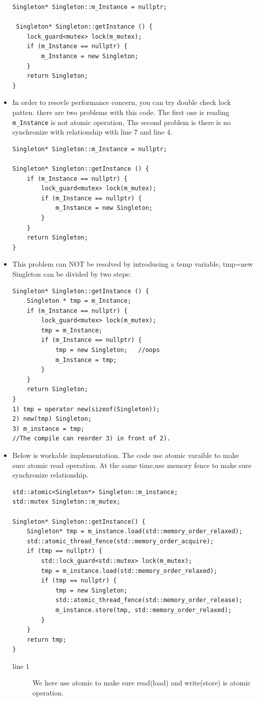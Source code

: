 \documentclass[a4paper,11pt,twoside]{book}
\begin{document}
\begin{itemize}
\begin{lstlisting}[]
Singleton* Singleton::m_Instance = nullptr;

 Singleton* Singleton::getInstance () {
	lock_guard<mutex> lock(m_mutex);
	if (m_Instance == nullptr) {
		m_Instance = new Singleton;
	}
	return Singleton;
}   
\end{lstlisting}

    \item In order to resovle performance concern, you can try double check lock patten. there are two problems with this code. The first one is reading \texttt{m\_Instance} is not atomic operation,  The second problem is there is no synchronize with relationship with line 7 and line 4. 
\begin{lstlisting}[]
Singleton* Singleton::m_Instance = nullptr;

Singleton* Singleton::getInstance () {
	if (m_Instance == nullptr) {
		lock_guard<mutex> lock(m_mutex);
		if (m_Instance == nullptr) {
			m_Instance = new Singleton;
		}
	}
	return Singleton;
}
\end{lstlisting}

    \item This problem can NOT be resolved by introducing a temp variable, tmp=new Singleton can be divided by two steps: 
\begin{lstlisting}[]
Singleton* Singleton::getInstance () {
	Singleton * tmp = m_Instance;
	if (m_Instance == nullptr) {
		lock_guard<mutex> lock(m_mutex);
		tmp = m_Instance;
		if (m_Instance == nullptr) {
			tmp = new Singleton;   //oops
			m_Instance = tmp;  
		}
	}
	return Singleton;
}
1) tmp = operator new(sizeof(Singleton));  
2) new(tmp) Singleton;  
3) m_instance = tmp;  
//The compile can reorder 3) in front of 2). 
\end{lstlisting}


    \item Below is workable implementation. The code use atomic varaible to make sure atomic read operation. At the same time,use memory fence to make sure synchronize relationship. 

\begin{lstlisting}[]
std::atomic<Singleton*> Singleton::m_instance;
std::mutex Singleton::m_mutex;

Singleton* Singleton::getInstance() {
    Singleton* tmp = m_instance.load(std::memory_order_relaxed);
    std::atomic_thread_fence(std::memory_order_acquire);
    if (tmp == nullptr) {
        std::lock_guard<std::mutex> lock(m_mutex);
        tmp = m_instance.load(std::memory_order_relaxed);
        if (tmp == nullptr) {
            tmp = new Singleton;
            std::atomic_thread_fence(std::memory_order_release);
            m_instance.store(tmp, std::memory_order_relaxed);
        }
    }
    return tmp;
}
\end{lstlisting}
\begin{description}
    \item[line 1] We here use atomic to make sure read(load) and write(store) is atomic operation.


\end{description}
\end{itemize}
\end{document}
